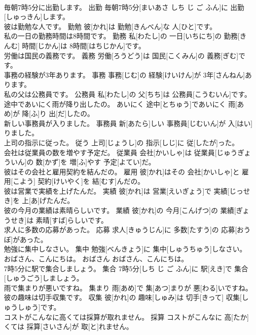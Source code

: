 \documentclass[8pt]{extreport}
\begin{document}
\begin{CJK}{UTF8}{min}
\\	毎朝7時5分に出勤します。	出勤	毎朝7時5分[まいあさ しち じ ご ふん]に 出勤[しゅっきん]します。	
\\	彼は勤勉な人です。	勤勉	彼[かれ]は 勤勉[きんべん]な 人[ひと]です。	
\\	私の一日の勤務時間は8時間です。	勤務	私[わたし]の 一日[いちにち]の 勤務[きんむ] 時間[じかん]は 8時間[はちじかん]です。	
\\	労働は国民の義務です。	義務	労働[ろうどう]は 国民[こくみん]の 義務[ぎむ]です。	
\\	事務の経験が3年あります。	事務	事務[じむ]の 経験[けいけん]が 3年[さんねん]あります。	
\\	私の父は公務員です。	公務員	私[わたし]の 父[ちち]は 公務員[こうむいん]です。	
\\	途中であいにく雨が降り出したの。	あいにく	途中[とちゅう]であいにく 雨[あめ]が 降[ふ]り 出[だ]したの。	
\\	新しい事務員が入りました。	事務員	新[あたら]しい 事務員[じむいん]が 入[はい]りました。	
\\	上司の指示に従った。	従う	上司[じょうし]の 指示[しじ]に 従[したが]った。	
\\	会社は従業員の数を増やす予定だ。	従業員	会社[かいしゃ]は 従業員[じゅうぎょういん]の 数[かず]を 増[ふ]やす 予定[よてい]だ。	
\\	彼はその会社と雇用契約を結んだの。	雇用	彼[かれ]はその 会社[かいしゃ]と 雇用[こよう] 契約[けいやく]を 結[むす]んだの。	
\\	彼は営業で実績を上げたんだ。	実績	彼[かれ]は 営業[えいぎょう]で 実績[じっせき]を 上[あ]げたんだ。	
\\	彼の今月の業績は素晴らしいです。	業績	彼[かれ]の 今月[こんげつ]の 業績[ぎょうせき]は 素晴[すば]らしいです。	
\\	求人に多数の応募があった。	応募	求人[きゅうじん]に 多数[たすう]の 応募[おうぼ]があった。	
\\	勉強に集中しなさい。	集中	勉強[べんきょう]に 集中[しゅうちゅう]しなさい。	
\\	おばさん、こんにちは。	おばさん	おばさん、こんにちは。	
\\	7時5分に駅で集合しましょう。	集合	7時5分[しち じ ご ふん]に 駅[えき]で 集合[しゅうごう]しましょう。	
\\	雨で集まりが悪いですね。	集まり	雨[あめ]で 集[あつ]まりが 悪[わる]いですね。	
\\	彼の趣味は切手収集です。	収集	彼[かれ]の 趣味[しゅみ]は 切手[きって] 収集[しゅうしゅう]です。	
\\	コストがこんなに高くては採算が取れません。	採算	コストがこんなに 高[たか]くては 採算[さいさん]が 取[と]れません。	

\end{CJK}
\end{document}
